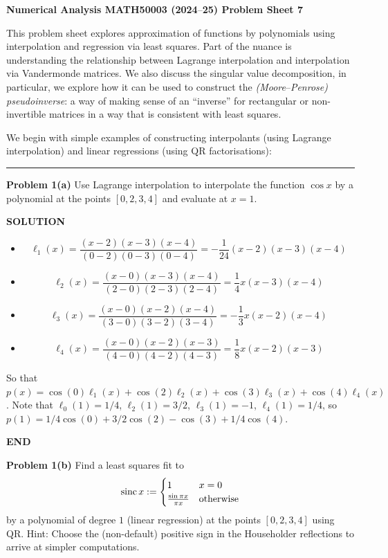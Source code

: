 \documentclass[12pt,a4paper]{article}
\def\endash{–}
\def\sinc{ {\rm sinc}\, }
\begin{document}
\textbf{Numerical Analysis MATH50003 (2024\ensuremath{\endash}25) Problem Sheet 7}

This problem sheet explores approximation of functions by polynomials using interpolation and regression via least squares. Part of the nuance is understanding the relationship between Lagrange interpolation and interpolation via  Vandermonde matrices. We also discuss the singular value decomposition, in particular, we explore how it can be used to construct the \emph{(Moore\ensuremath{\endash}Penrose) pseudoinverse}: a way of making sense of an ``inverse'' for rectangular or non-invertible matrices in a way that is consistent with least squares.

We begin with simple examples of constructing interpolants (using Lagrange interpolation) and linear regressions (using QR factorisations):

\rule{\textwidth}{1pt}
\textbf{Problem 1(a)} Use Lagrange interpolation to interpolate the function $\cos x$ by a polynomial at the points $[0,2,3,4]$ and evaluate at $x = 1$.

\textbf{SOLUTION}

\begin{itemize}
\item \[
\ensuremath{\ell}_1(x)=\frac{(x-2)(x-3)(x-4)}{(0-2)(0-3)(0-4)}=-\frac{1}{24}(x-2)(x-3)(x-4)
\]

\item \[
\ensuremath{\ell}_2(x)=\frac{(x-0)(x-3)(x-4)}{(2-0)(2-3)(2-4)}=\frac{1}{4}x(x-3)(x-4)
\]

\item \[
\ensuremath{\ell}_3(x)=\frac{(x-0)(x-2)(x-4)}{(3-0)(3-2)(3-4)}=-\frac{1}{3}x(x-2)(x-4)
\]

\item \[
\ensuremath{\ell}_4(x)=\frac{(x-0)(x-2)(x-3)}{(4-0)(4-2)(4-3)}=\frac{1}{8}x(x-2)(x-3)
\]
\end{itemize}
So that $p(x)=\cos(0)\ensuremath{\ell}_1(x)+\cos(2)\ensuremath{\ell}_2(x)+\cos(3)\ensuremath{\ell}_3(x)+\cos(4)\ensuremath{\ell}_4(x)$. Note that $\ensuremath{\ell}_0(1)=1/4$, $\ensuremath{\ell}_2(1)=3/2$, $\ensuremath{\ell}_3(1)=-1$, $\ensuremath{\ell}_4(1)=1/4$, so $p(1)=1/4\cos(0)+3/2\cos(2)-\cos(3)+1/4\cos(4)$.

\textbf{END}

\textbf{Problem 1(b)} Find a least squares fit to 
\[
\sinc x := \begin{cases} 1 & x = 0 \\
{\sin \ensuremath{\pi} x \over \ensuremath{\pi} x} & \hbox{otherwise}
\end{cases}
\]
by a polynomial of degree $1$ (linear regression) at the points $[0,2,3,4]$ using QR. Hint: Choose the (non-default) positive sign in the Householder reflections to arrive at simpler computations.
\end{document}
